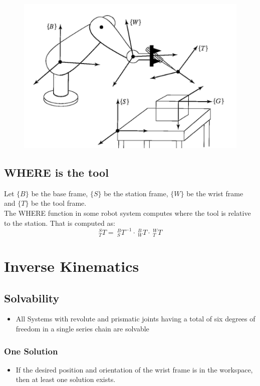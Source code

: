 \documentclass[10pt,a4paper]{article}
\begin{document}
\begin{figure}[H]
	\includegraphics[width=0.5\columnwidth]{imgs/standard_frames.png}
\end{figure}

\subsection{WHERE is the tool}
Let $\{B\}$ be the base frame, $\{S\}$ be the station frame, $\{W\}$ be the wrist frame and $\{T\}$ be the tool frame. \\
The WHERE function in some robot system computes where the tool is relative to the station. That is computed as: \\
$$
	^S_TT = ~^B_ST^{-1} ⋅ ~^B_WT ⋅ ~^W_TT
$$

\section{Inverse Kinematics}
\subsection{Solvability}
\begin{itemize}
	\item All Systems with revolute and prismatic joints having a total of six degrees of freedom in a single series chain are solvable
\end{itemize}
\subsubsection{One Solution}
\begin{itemize}
	\item If the desired position and orientation of the wrist frame is in the workspace, then at least one solution exists.
\end{itemize}
\end{document}
